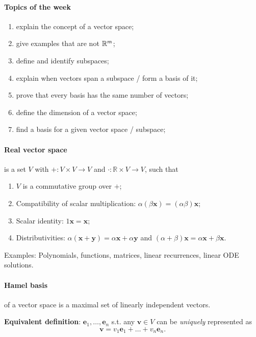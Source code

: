 \documentclass{article}
\begin{document}
\paragraph{Topics of the week} 

\begin{enumerate}
    \item explain the concept of a vector space;
    \item give examples that are not $\mathbb{R}^m$;
    \item define and identify subspaces;
    \item explain when vectors span a subspace / form a basis of it;
    \item prove that every basis has the same number of vectors;
    \item define the dimension of a vector space;
    \item find a basis for a given vector space / subspace;
\end{enumerate}

\paragraph{Real vector space} is a set $V$ with $+ : V \times V \to V$ and $\cdot : \mathbb R \times V \to V$, such that

\begin{enumerate}
    \item $V$ is a commutative group over $+$;
    \item Compatibility of scalar multiplication: $\alpha (\beta \mathbf x) = (\alpha \beta) \mathbf x$;
    \item Scalar identity: $1 \mathbf x = \mathbf x$;
    \item Distributivities: $\alpha(\mathbf x + \mathbf y) = \alpha \mathbf x + \alpha \mathbf y$ and $(\alpha + \beta) \mathbf x = \alpha \mathbf x + \beta \mathbf x$.
\end{enumerate}

Examples: Polynomials, functions, matrices, linear recurrences, linear ODE solutions.


\paragraph{Hamel basis} of a vector space is a maximal set of linearly independent vectors.

\textbf{Equivalent definition}: $\mathbf e_1, \dots, \mathbf e_n$ s.t. any $\mathbf v \in V$ can be \textit{uniquely} represented as
$$
\mathbf v = v_1 \mathbf e_1 + \dots + v_n \mathbf e_n.
$$
\end{document}
